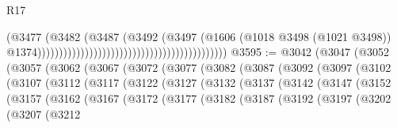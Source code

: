 \begin{lexlean}{R17}
\begin{coremodule}
                                                                                (@3477
                                                                                  (@3482
                                                                                    (@3487
                                                                                      (@3492
                                                                                        (@3497
                                                                                          (@1606
                                                                                            (@1018
                                                                                              @3498
                                                                                              (@1021
                                                                                                @3498))
                                                                                            @1374))))))))))))))))))))))))))))))))))))))))))))
@3595 := @3042
    (@3047
      (@3052
        (@3057
          (@3062
            (@3067
              (@3072
                (@3077
                  (@3082
                    (@3087
                      (@3092
                        (@3097
                          (@3102
                            (@3107
                              (@3112
                                (@3117
                                  (@3122
                                    (@3127
                                      (@3132
                                        (@3137
                                          (@3142
                                            (@3147
                                              (@3152
                                                (@3157
                                                  (@3162
                                                    (@3167
                                                      (@3172
                                                        (@3177
                                                          (@3182
                                                            (@3187
                                                              (@3192
                                                                (@3197
                                                                  (@3202
                                                                    (@3207
                                                                      (@3212

\end{coremodule}
\end{lexlean}
